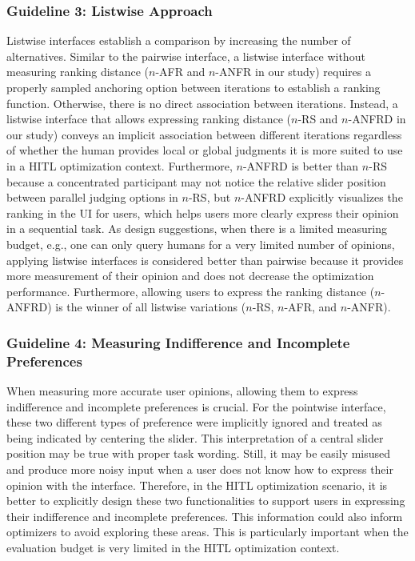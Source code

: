 \documentclass[acmsmall,screen,nonacm]{acmart}
\begin{document}
\subsubsection{Guideline 3: Listwise Approach}
Listwise interfaces establish a comparison by increasing the number of alternatives.
%
Similar to the pairwise interface, a listwise interface without measuring ranking distance ($n$-AFR and $n$-ANFR in our study) requires a properly sampled anchoring option between iterations to establish a ranking function.
%
Otherwise, there is no direct association between iterations. Instead, a listwise interface that allows expressing ranking distance ($n$-RS and $n$-ANFRD in our study) conveys an implicit association between different iterations regardless of whether the human provides local or global judgments it is more suited to use in a HITL optimization context.
%
Furthermore, $n$-ANFRD is better than $n$-RS because a concentrated participant may not notice the relative slider position between parallel judging options in $n$-RS, but $n$-ANFRD explicitly visualizes the ranking in the UI for users, which helps users more clearly express their opinion in a sequential task.
%
As design suggestions, when there is a limited measuring budget, e.g., one can only query humans for a very limited number of opinions, applying listwise interfaces is considered better than pairwise because it provides more measurement of their opinion and does not decrease the optimization performance.
%
Furthermore, allowing users to express the ranking distance ($n$-ANFRD) is the winner of all listwise variations ($n$-RS, $n$-AFR, and $n$-ANFR).
\subsubsection{Guideline 4: Measuring Indifference and Incomplete Preferences}
When measuring more accurate user opinions, allowing them to express indifference and incomplete preferences is crucial. For the pointwise interface, these two different types of preference were implicitly ignored and treated as being indicated by centering the slider. This interpretation of a central slider position may be true with proper task wording. Still, it may be easily misused and produce more noisy input when a user does not know how to express their opinion with the interface. Therefore, in the HITL optimization scenario, it is better to explicitly design these two functionalities to support users in expressing their indifference and incomplete preferences. This information could also inform optimizers to avoid exploring these areas. This is particularly important when the evaluation budget is very limited in the HITL optimization context.
\end{document}
